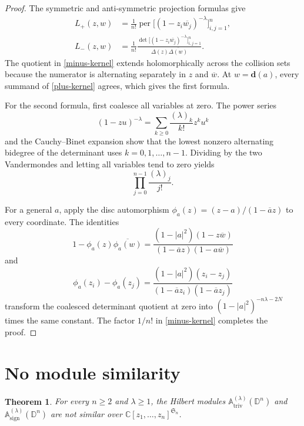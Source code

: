 \documentclass[11pt]{article}
\newtheorem{theorem}{Theorem}
\newcommand{\D}{\mathbb D}
\newcommand{\C}{\mathbb C}
\newcommand{\Sn}{\mathfrak S_n}
\newcommand{\diagpt}[1]{\boldsymbol d(#1)}
\begin{document}
\begin{proof}
The symmetric and anti-symmetric projection formulas give
\begin{align}
 L_+(z,w)
 &=\frac1{n!}\operatorname{per}
    \big[(1-z_i\overline{w_j})^{-\lambda}\big]_{i,j=1}^n,
 \label{plus-kernel}\\
 L_-(z,w)
 &=\frac1{n!}\frac{\det
    \big[(1-z_i\overline{w_j})^{-\lambda}\big]_{i,j=1}^n}
    {\Delta(z)\overline{\Delta(w)}}.
 \label{minus-kernel}
\end{align}
The quotient in \eqref{minus-kernel} extends holomorphically across the
collision sets because the numerator is alternating separately in $z$ and
$\overline w$.  At $w=\diagpt a$, every summand of
\eqref{plus-kernel} agrees, which gives the first formula.

For the second formula, first coalesce all variables at zero.  The power
series
\[
 (1-zu)^{-\lambda}=\sum_{k\geq0}
 \frac{(\lambda)_k}{k!}z^ku^k
\]
and the Cauchy--Binet expansion show that the lowest nonzero alternating
bidegree of the determinant uses $k=0,1,\ldots,n-1$.  Dividing by the two
Vandermondes and letting all variables tend to zero yields
\[
 \prod_{j=0}^{n-1}\frac{(\lambda)_j}{j!}.
\]

For a general $a$, apply the disc automorphism
$\phi_a(z)=(z-a)/(1-\overline a z)$ to every coordinate.  The identities
\[
 1-\phi_a(z)\overline{\phi_a(w)}
 =\frac{(1-|a|^2)(1-z\overline w)}
 {(1-\overline a z)(1-a\overline w)}
\]
and
\[
 \phi_a(z_i)-\phi_a(z_j)
 =\frac{(1-|a|^2)(z_i-z_j)}
 {(1-\overline a z_i)(1-\overline a z_j)}
\]
transform the coalesced determinant quotient at zero into
$(1-|a|^2)^{-n\lambda-2N}$ times the same constant.  The factor $1/n!$ in
\eqref{minus-kernel} completes the proof.
\end{proof}

\section{No module similarity}

\begin{theorem}\label{main-theorem}
For every $n\geq2$ and $\lambda\geq1$, the Hilbert modules
$\mathbb A_{\mathrm{triv}}^{(\lambda)}(\D^n)$ and
$\mathbb A_{\mathrm{sign}}^{(\lambda)}(\D^n)$ are not similar over
$\C[z_1,\ldots,z_n]^{\Sn}$.
\end{theorem}
\end{document}
